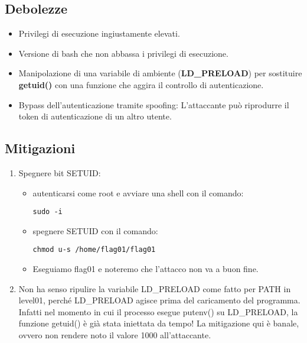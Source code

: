 \subsection{Debolezze}
\begin{itemize}
    \item Privilegi di esecuzione ingiustamente elevati.
    \item Versione di bash che non abbassa i privilegi di esecuzione.
    \item Manipolazione di una variabile di ambiente (\textbf{LD\_PRELOAD}) per sostituire \textbf{getuid()} con una funzione che aggira il controllo di autenticazione.
    \item Bypass dell'autenticazione tramite spoofing: L'attaccante può riprodurre il token di autenticazione di un altro utente.
\end{itemize}
\subsection{Mitigazioni}
\begin{enumerate}
    \item Spegnere bit SETUID:
    \begin{itemize}
        \item autenticarsi come root e avviare una shell con il comando: \begin{lstlisting}[style=bashstyle] 
        sudo -i
        \end{lstlisting}
        \item spegnere SETUID con il comando: \begin{lstlisting}[style=bashstyle] 
        chmod u-s /home/flag01/flag01
        \end{lstlisting}   
        \item Eseguiamo flag01 e noteremo che l’attacco non va a buon fine. 
    \end{itemize}
    \item Non ha senso ripulire la variabile LD\_PRELOAD come fatto per PATH in level01, perché LD\_PRELOAD agisce prima del caricamento del programma. Infatti nel momento in cui il processo esegue putenv() su LD\_PRELOAD, la funzione getuid() è già stata iniettata da tempo!
    La mitigazione qui è banale, ovvero non rendere noto il valore 1000 all'attaccante.
\end{enumerate}



